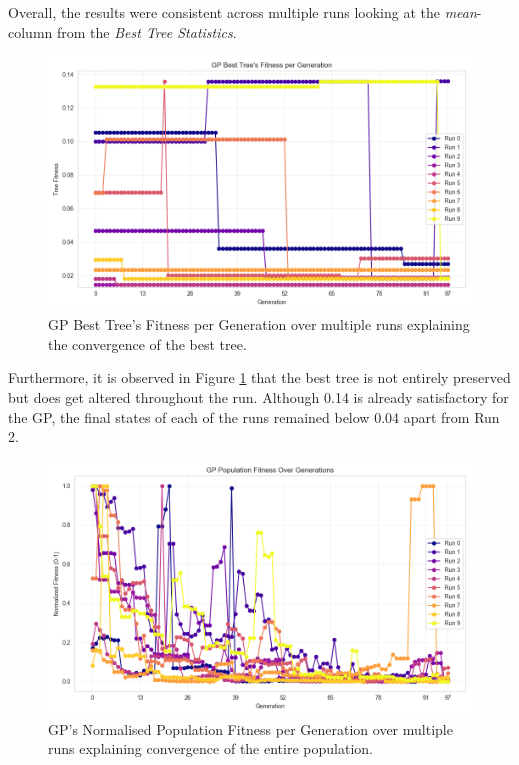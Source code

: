 \documentclass{article}
\begin{document}
Overall, the results were consistent across multiple runs looking at the \emph{mean}-column from the \emph{Best Tree Statistics}.

\begin{figure}[H]
  \includegraphics[width=\linewidth]{bestTree.png}
  \caption{GP Best Tree's Fitness per Generation over multiple runs explaining the convergence of the best tree.}
  \label{bestTree}
\end{figure}

Furthermore, it is observed in Figure \ref{bestTree} that the best tree is not entirely preserved but does get altered throughout the run. Although 0.14 is already satisfactory for the GP, the final states of each of the runs remained below 0.04 apart from Run 2.

\begin{figure}[H]
  \includegraphics[width=\linewidth]{normalisedplot.png}
  \caption{GP's Normalised Population Fitness per Generation over multiple runs explaining convergence of the entire population.}
  \label{gppopFitness}
\end{figure}
\end{document}
